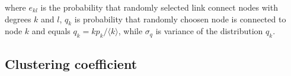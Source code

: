 where $e_{kl}$ is the probability that randomly selected link connect nodes with degrees $k$ and $l$, $q_k$ is probability that randomly choosen node is connected to node $k$ and equals $q_k = kp_k / \langle k \rangle$, while $\sigma_q$ is variance of the distribution $q_k$. 

\subsection{Clustering coefficient}





